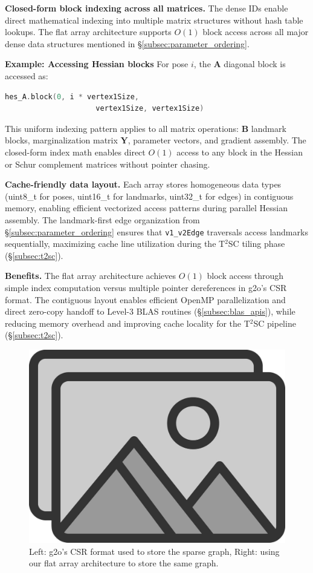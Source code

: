 \textbf{Closed-form block indexing across all matrices.} The dense IDs enable direct mathematical indexing 
into multiple matrix structures without hash table lookups. The flat array architecture supports $O(1)$ 
block access across all major dense data structures mentioned in \S\ref{subsec:parameter_ordering}.


\hspace{-1.5em}
\textbf{Example: Accessing Hessian blocks} \newline
    For pose $i$, the $\mathbf{A}$ diagonal block is accessed as:
\begin{lstlisting}[language=C++, basicstyle=\ttfamily\small]
hes_A.block(0, i * vertex1Size, 
                     vertex1Size, vertex1Size)
\end{lstlisting}

This uniform indexing pattern applies to all matrix operations: $\mathbf{B}$ landmark blocks, 
marginalization matrix $\mathbf{Y}$, parameter vectors, and gradient assembly. The closed-form index 
math enables direct $O(1)$ access to any block in the Hessian or Schur complement matrices without 
pointer chasing.

\textbf{Cache-friendly data layout.} Each array stores homogeneous data types (uint8\_t for poses, uint16\_t 
for landmarks, uint32\_t for edges) in contiguous memory, enabling efficient vectorized access patterns during 
parallel Hessian assembly. The landmark-first edge organization from \S\ref{subsec:parameter_ordering} ensures 
that \texttt{v1\_v2Edge} traversals access landmarks sequentially, maximizing cache line utilization during 
the T$^2$SC tiling phase (\S\ref{subsec:t2sc}).

\textbf{Benefits.} The flat array architecture achieves $O(1)$ block access through simple index 
computation versus multiple pointer dereferences in g2o's CSR format. The contiguous layout enables 
efficient OpenMP parallelization and direct zero-copy handoff to Level-3 BLAS routines (\S\ref{subsec:blas_apis}), 
while reducing memory overhead and improving cache locality for the T$^2$SC pipeline (\S\ref{subsec:t2sc}).

\begin{figure}[t]
  \centering
  \includegraphics[width=0.75\linewidth]{figs/placeholder}
  \caption{Left: g2o's CSR format used to store the sparse graph, Right: using our flat array architecture to
  store the same graph.}
  \label{fig:connectivity_storage}
\end{figure}

